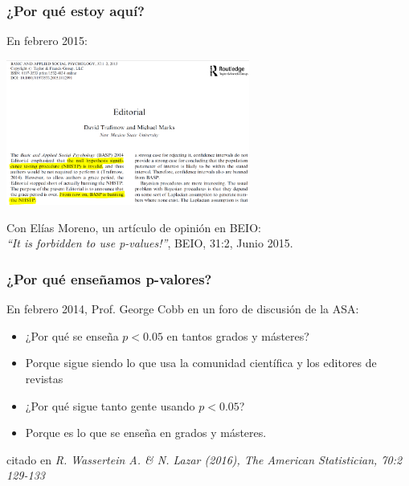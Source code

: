 \documentclass[9pt]{beamer}
\begin{document}
\begin{frame}
  \frametitle{¿Por qué estoy aquí?}
  \begin{overlayarea}{\textwidth}{\textheight}
    En febrero 2015:
    \begin{center}
      \includegraphics[width=8cm]{images/ban_editorial_2.png}
    \end{center}
    \pause
    Con Elías Moreno, un  artículo de opini\'on en BEIO:\\ 
    \textit{``It is forbidden to use p-values!''}, BEIO, 31:2, Junio
    2015.
  \end{overlayarea}
\end{frame}
\begin{frame}
  \frametitle{¿Por qué enseñamos p-valores?}

  En febrero 2014, Prof. George Cobb en un foro de discusi\'on de la
  ASA:
  \begin{block}{}
    \begin{itemize}
    \item<2-> ¿Por qué se enseña $p < 0.05$ en tantos grados y
      másteres?
    \item<3-> Porque sigue siendo lo que usa la comunidad
      científica y los editores de revistas
    \item<4-> ¿Por qué sigue tanto gente usando  $p < 0.05$?
      
    \item<5-> Porque es lo que se enseña en grados y másteres.
    \end{itemize}
  \end{block}
      \hfill\begin{minipage}[h]{0.7\linewidth}
    {\scriptsize citado en \textit{R. Wassertein A. \&
        N. Lazar (2016), The American Statistician, 70:2 129-133}}
  \end{minipage}\bigskip
  
  \begin{center}
    \end{center}
\end{frame}
\end{document}
